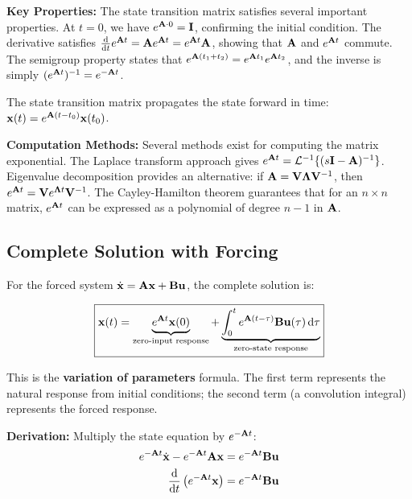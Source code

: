 \textbf{Key Properties:}
The state transition matrix satisfies several important properties. At $t=0$, we have $e^{\mathbf{A} \cdot 0} = \mathbf{I}$, confirming the initial condition. The derivative satisfies $\frac{\mathrm{d}}{\mathrm{d} t}e^{\mathbf{A}t} = \mathbf{A}e^{\mathbf{A}t} = e^{\mathbf{A}t}\mathbf{A}$, showing that $\mathbf{A}$ and $e^{\mathbf{A}t}$ commute. The semigroup property states that $e^{\mathbf{A}(t_1+t_2)} = e^{\mathbf{A}t_1}e^{\mathbf{A}t_2}$, and the inverse is simply $(e^{\mathbf{A}t})^{-1} = e^{-\mathbf{A}t}$.

The state transition matrix propagates the state forward in time: $\mathbf{x}(t) = e^{\mathbf{A}(t-t_0)}\mathbf{x}(t_0)$.

\textbf{Computation Methods:}
Several methods exist for computing the matrix exponential. The Laplace transform approach gives $e^{\mathbf{A}t} = \mathcal{L}^{-1}\{(s\mathbf{I}-\mathbf{A})^{-1}\}$. Eigenvalue decomposition provides an alternative: if $\mathbf{A} = \mathbf{V}\mathbf{\Lambda}\mathbf{V}^{-1}$, then $e^{\mathbf{A}t} = \mathbf{V}e^{\mathbf{\Lambda}t}\mathbf{V}^{-1}$. The Cayley-Hamilton theorem guarantees that for an $n \times n$ matrix, $e^{\mathbf{A}t}$ can be expressed as a polynomial of degree $n-1$ in $\mathbf{A}$.

\subsection{Complete Solution with Forcing}

For the forced system $\dot{\mathbf{x}} = \mathbf{A}\mathbf{x} + \mathbf{B}\mathbf{u}$, the complete solution is:

\begin{equation}
\boxed{
    \mathbf{x}(t) = \underbrace{e^{\mathbf{A}t}\mathbf{x}(0)}_{\text{zero-input response}} + \underbrace{\int_0^t e^{\mathbf{A}(t-\tau)}\mathbf{B}\mathbf{u}(\tau)\,\mathrm{d}\tau}_{\text{zero-state response}}
}
\label{eq:complete_solution}
\end{equation}

This is the \textbf{variation of parameters} formula. The first term represents the natural response from initial conditions; the second term (a convolution integral) represents the forced response.

\textbf{Derivation:} Multiply the state equation by $e^{-\mathbf{A}t}$:
\begin{align}
    e^{-\mathbf{A}t}\dot{\mathbf{x}} - e^{-\mathbf{A}t}\mathbf{A}\mathbf{x} &= e^{-\mathbf{A}t}\mathbf{B}\mathbf{u} \\
    \frac{\mathrm{d}}{\mathrm{d} t}\left(e^{-\mathbf{A}t}\mathbf{x}\right) &= e^{-\mathbf{A}t}\mathbf{B}\mathbf{u}
\end{align}

